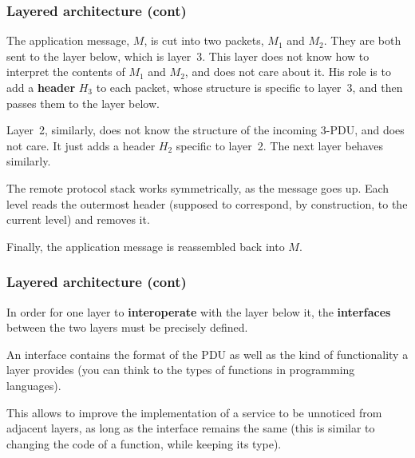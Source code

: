 %
\begin{frame}
\frametitle{Layered architecture (cont)}

The application message, \(M\), is cut into two packets, \(M_1\) and
\(M_2\). They are both sent to the layer below, which is layer~3. This
layer does not know how to interpret the contents of \(M_1\) and
\(M_2\), and does not care about it. His role is to add a
\textbf{header} \(H_3\) to each packet, whose structure is specific to
layer~3, and then passes them to the layer below.

\bigskip

Layer~2, similarly, does not know the structure of the incoming 3-PDU,
and does not care. It just adds a header \(H_2\) specific to layer~2.
The next layer behaves similarly.

\bigskip

The remote protocol stack works symmetrically, as the message goes
up. Each level reads the outermost header (supposed to correspond, by
construction, to the current level) and removes it.

\bigskip

Finally, the application message is reassembled back into \(M\).

\end{frame}

%
\begin{frame}
\frametitle{Layered architecture (cont)}

In order for one layer to \textbf{interoperate} with the layer below
it, the \textbf{interfaces} between the two layers must be precisely
defined.

\bigskip

An interface contains the format of the PDU as well as the kind of
functionality a layer provides (you can think to the types of
functions in programming languages).

\bigskip

This allows to improve the implementation of a service to be unnoticed
from adjacent layers, as long as the interface remains the same (this
is similar to changing the code of a function, while keeping its
type).

\end{frame}

